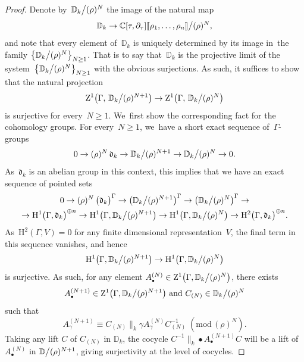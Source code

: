 \documentclass[10pt,a4paper]{article}
\numberwithin{equation}{section}
\let\oldbullet\bullet
\renewcommand{\bullet}{{\scriptscriptstyle\oldbullet}}
\theoremstyle{plain}
\theoremstyle{definition}
\newcommand{\tx}{\text}
\newcommand{\nbd}{\nobreakdash-\hspace{0pt}}
\newcommand{\bbC}{\ensuremath{\mathbb{C}}}
\newcommand{\bbD}{\ensuremath{\mathbb{D}}}
\newcommand{\frakd}{\ensuremath{\mathfrak{d}}}
\newcommand{\rmH}{\ensuremath{\mathrm{H}}}
\newcommand{\rmZ}{\ensuremath{\mathrm{Z}}}
\newcommand{\llbrkt}{[\![}
\newcommand{\rrbrkt}{]\!]}
\renewcommand{\pmod}[1]{\;(\mathrm{mod}\, #1)}
\let\Ga\Gamma
\let\ga\gamma
\begin{document}
\begin{proof}
Denote by~$\bbD_k\big\slash (\rho)^N$ the image of the natural map
\begin{equation*}
	\bbD_k
\to
	\bbC[\tau,\partial_\tau]\llbrkt \rho_1,\ldots,\rho_n\rrbrkt \big\slash (\rho)^N
\tx{,}
\end{equation*}
and note that every element of~$\bbD_k$ is uniquely determined by its image in~the family $\big\{\bbD_k\big\slash (\rho)^N\big\}_{N\geq 1}$. That is to say that~$\bbD_k$ is the projective limit of the system~$\big\{\bbD_k\big\slash (\rho)^N\big\}_{N\geq 1}$ with the obvious surjections. As such, it suffices to show that the natural projection
\begin{equation*}
\rmZ^1\bigl(\Ga,\, \bbD_k \big\slash (\rho)^{N+1} \bigr)
\to
\rmZ^1\bigl(\Ga,\, \bbD_k \big\slash (\rho)^{N} \bigr)
\end{equation*}
is surjective for every~$N\geq 1$. We~first show the corresponding fact for the cohomology groups. For every~$N \geq 1$, we~have a short exact sequence of~$\Ga$\nbd{}groups
\begin{equation*}
0
\to
(\rho)^N\, \frakd_k
\to
\bbD_k \big\slash (\rho)^{N+1}
\to
\bbD_k\big\slash (\rho)^{N}
\to
0
\tx{.}
\end{equation*}
As~$\frakd_k$ is an abelian group in this context, this implies that we have an exact sequence of pointed sets
\begin{multline*}
0
\to
(\rho)^N\, \bigl(\frakd_k\bigr)^\Ga
\to
\bigl(\bbD_k \big\slash (\rho)^{N+1} \bigr)^\Ga
\to
\bigl(\bbD_k \big\slash (\rho)^{N} \bigr)^\Ga
\to
\\
\to
\rmH^1\bigl(\Ga, \frakd_k\bigr)^{\oplus n}
\to
\rmH^1\bigl(\Ga, \bbD_k\big\slash (\rho)^{N+1} \bigr)
\to
\rmH^1\bigl(\Ga, \bbD_k\big\slash (\rho)^{N} \bigr)
\to
\rmH^2\bigl(\Ga, \frakd_k\bigr)^{\oplus n}
\tx{.}
\end{multline*}
As~$\rmH^2(\Ga,V) = 0$ for any finite dimensional representation~$V$, the final term in this sequence vanishes, and hence
\begin{equation*}
	\rmH^1\bigl(\Ga, \bbD_k\big\slash (\rho)^{N+1}\bigr)
\to
	\rmH^1\bigl(\Ga, \bbD_k\big\slash (\rho)^{N}\bigr)
\end{equation*}
is surjective. As such, for any element $A_\bullet^{(N)}\in \rmZ^1\bigl(\Ga,\bbD_k\big\slash (\rho)^{N}\bigr)$, there exists
\[
A_\bullet^{(N+1)}\in \rmZ^1\bigl(\Ga,\bbD_k\big\slash (\rho)^{N+1}\bigr)\tx{ and }C_{(N)}\in\bbD_k\big\slash (\rho)^N\]
such that
\[
A_\ga^{(N+1)} \equiv C_{(N)}\big\|_k\ga A_\ga^{(N)} C_{(N)}^{-1} \pmod{(\rho)^{N}}.\]
Taking any lift $C$ of $C_{(N)}$ in $\bbD_k$, the cocycle $C^{-1}\big\|_k\bullet A_\bullet^{(N+1)} C$ will be a lift of $A_\bullet^{(N)}$ in $\bbD\big\slash (\rho)^{N+1}$, giving surjectivity at the level of cocycles.
\end{proof}
\end{document}
